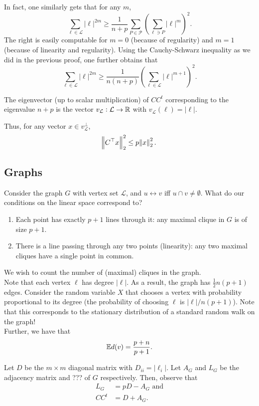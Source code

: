 \documentclass{article}
\begin{document}
		In fact, one similarly gets that for any $m$,
		\[ \sum_{\ell \in \mathcal{L}} |\ell|^{2m} \ge \frac{1}{n+p} \sum_{P \in \mathcal{P}} \left( \sum_{\ell \ni P} |\ell|^m \right)^2. \]
		The right is easily computable for $m = 0$ (because of regularity) and $m = 1$ (because of linearity and regularity).
		Using the Cauchy-Schwarz inequality as we did in the previous proof, one further obtains that
		\[ \sum_{\ell \in \mathcal{L}} |\ell|^{2m} \ge \frac{1}{n(n+p)} \left(\sum_{\ell \in \mathcal{L}} |\ell|^{m+1}\right)^2. \]
		

		\begin{porism}
			The eigenvector (up to scalar multiplication) of $CC^t$ corresponding to the eigenvalue $n+p$ is the vector $v_{\mathcal{L}} : \mathcal{L} \to \mathbb{R}$ with $v_\mathcal{L}(\ell) = |\ell|$.
		\end{porism}

		Thus, for any vector $x \in v_{\mathcal{L}}^\perp$,
		\[ \norm{C^\top x}_2^2 \le p \norm{x}_2^2. \]
		
	\subsection{Graphs}

		Consider the graph $G$ with vertex set $\mathcal{L}$, and $u \leftrightarrow v$ iff $u \cap v \ne \emptyset$. What do our conditions on the linear space correspond to?
		\begin{enumerate}
			\item Each point has exactly $p+1$ lines through it: any maximal clique in $G$ is of size $p+1$.
			\item There is a line passing through any two points (linearity): any two maximal cliques have a single point in common.
		\end{enumerate}

		We wish to count the number of (maximal) cliques in the graph.\\
		Note that each vertex $\ell$ has degree $|\ell|$. As a result, the graph has $\frac{1}{2}n(p+1)$ edges.
		Consider the random variable $X$ that chooses a vertex with probability proportional to its degree (the probability of choosing $\ell$ is $|\ell|/n(p+1)$). Note that this corresponds to the stationary distribution of a standard random walk on the graph!\\
		Further, we have that
		\[ \mathbb{E} d(v) = \frac{p+n}{p+1}. \]

		Let $D$ be the $m \times m$ diagonal matrix with $D_{ii} = |\ell_i|$. Let $A_G$ and $L_G$ be the adjacency matrix and ??? of $G$ respectively. Then, observe that
		\begin{align*}
			L_G &= pD - A_G \text{ and} \\
			CC^t &= D + A_G.
		\end{align*}
	
\end{document}
